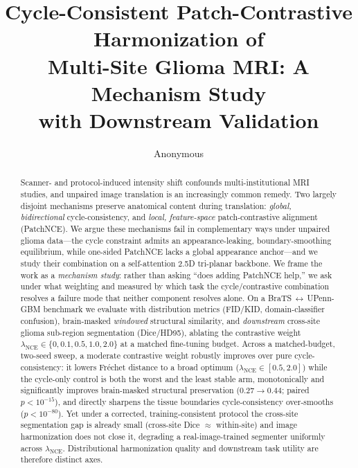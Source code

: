 \documentclass[runningheads]{llncs}
\begin{document}
\title{Cycle-Consistent Patch-Contrastive Harmonization of\\
Multi-Site Glioma MRI: A Mechanism Study\\with Downstream Validation}


\author{Anonymous}

\maketitle

\begin{abstract}
Scanner- and protocol-induced intensity shift confounds multi-institutional MRI
studies, and unpaired image translation is an increasingly common remedy.
Two largely disjoint mechanisms preserve anatomical content during translation:
\emph{global, bidirectional} cycle-consistency, and \emph{local, feature-space}
patch-contrastive alignment (PatchNCE). We argue these mechanisms fail in
complementary ways under unpaired glioma data---the cycle constraint admits an
appearance-leaking, boundary-smoothing equilibrium, while one-sided PatchNCE
lacks a global appearance anchor---and we study their combination on a
self-attention 2.5D tri-planar backbone. We frame the work as a \emph{mechanism
study}: rather than asking ``does adding PatchNCE help,'' we ask under what
weighting and measured by which task the cycle/contrastive combination resolves
a failure mode that neither component resolves alone. On a
BraTS\,$\leftrightarrow$\,UPenn-GBM benchmark we evaluate with distribution
metrics (FID/KID, domain-classifier confusion), brain-masked \emph{windowed}
structural similarity, and \emph{downstream} cross-site glioma sub-region
segmentation (Dice/HD95), ablating the contrastive weight
$\lambda_{\mathrm{NCE}}\in\{0,0.1,0.5,1.0,2.0\}$ at a matched fine-tuning budget.
Across a matched-budget, two-seed sweep, a moderate contrastive weight robustly
improves over pure cycle-consistency: it lowers Fr\'echet distance to a broad
optimum ($\lambda_{\mathrm{NCE}}\!\in\![0.5,2.0]$) while the cycle-only control is
both the worst and the least stable arm, monotonically and significantly improves
brain-masked structural preservation ($0.27\!\to\!0.44$; paired $p{<}10^{-15}$),
and directly sharpens the tissue boundaries cycle-consistency over-smooths
($p{<}10^{-80}$). Yet under a corrected, training-consistent
protocol the cross-site segmentation gap is already small (cross-site Dice
$\approx$ within-site) and image harmonization does not close it, degrading a
real-image-trained segmenter uniformly across $\lambda_{\mathrm{NCE}}$. Distributional
harmonization quality and downstream task utility are therefore distinct axes.
\end{abstract}
\end{document}

